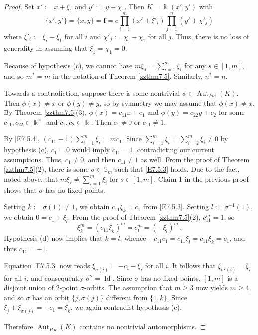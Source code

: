 \documentclass[12pt]{amsart}
\theoremstyle{plain}
\numberwithin{theorem}{section}
\numberwithin{equation}{theorem}
\theoremstyle{definition}
\newcommand{\SB}{\mathbb{S}}
\DeclareMathOperator{\Aut}{Aut}
\newcommand \bff {{\mathbf{f}}}
\newcommand \kx {\Bbbk^\times}
\DeclareMathOperator{\Id}{Id}
\begin{document}
\begin{proof}
Set $x' := x+\xi_1$ and $y' := y+\chi_1$.  Then $K = \Bbbk(x',y')$ with
$$
\{x',y'\} = \{x,y\} = \bff = c\prod_{i=1}^m (x'+\xi'_i) \prod_{j=1}^{n} (y'+\chi'_j)
$$
where $\xi'_i := \xi_i-\xi_1$ for all $i$ and $\chi'_j := \chi_j-\chi_1$ for all $j$.  Thus, there is no loss of generality in assuming that $\xi_1 = \chi_1 = 0$.

Because of hypothesis (c), we cannot have $m \xi_s = \sum_{i=1}^m \xi_i$ for any $s \in [1,m]$, and so $m^* = m$ in the notation of Theorem \ref{zzthm7.5}.  Similarly, $n^*=n$.

Towards a contradiction, suppose there is some nontrivial $\phi \in \Aut_{Poi}(K)$.  Then $\phi(x) \ne x$ or $\phi(y) \ne y$, so by symmetry we may assume that $\phi(x) \ne x$.  By Theorem \ref{zzthm7.5}(3), $\phi(x) = c_{11}x+c_1$ and $\phi(y) = c_{22}y+c_2$ for some $c_{11},c_{22} \in \kx$ and $c_1,c_2 \in \Bbbk$.  Then $c_1 \ne 0$ or $c_{11} \ne 1$.

By \eqref{E7.5.4}, $(c_{11}-1) \sum_{i=1}^m \xi_i = mc_1$.  Since $\sum_{i=1}^m \xi_i = \sum_{i=2}^m \xi_i \ne 0$ by hypothesis (c), $c_1=0$ would imply $c_{11}=1$, contradicting our current assumptions.  Thus, $c_1 \ne 0$, and then $c_{11} \ne 1$ as well.  From the proof of Theorem \ref{zzthm7.5}(2), there is some $\sigma \in \SB_m$ such that \eqref{E7.5.3} holds.  Due to the fact, noted above, that $m \xi_s \ne \sum_{i=1}^m \xi_i$ for $s \in [1,m]$, Claim 1 in the previous proof shows that $\sigma$ has no fixed points.

Setting $k := \sigma(1) \ne 1$, we obtain $c_{11} \xi_k = c_1$ from \eqref{E7.5.3}.  Setting $l := \sigma^{-1}(1)$, we obtain $0 = c_1 + \xi_l$.  From the proof of Theorem \ref{zzthm7.5}(2), $c_{11}^m=1$, so
$$
\xi_k^m = (c_{11} \xi_k)^m = c_1^m = (- \xi_l)^m \,.
$$
Hypothesis (d) now implies that $k=l$, whence $-c_{11} c_1 = c_{11} \xi_l = c_{11} \xi_k = c_1$, and thus $c_{11} = -1$.

Equation \eqref{E7.5.3} now reads $\xi_{\sigma(i)} = - c_1 - \xi_i$ for all $i$.  It follows that $\xi_{\sigma^2(i)} = \xi_i$ for all $i$, and consequently $\sigma^2 = \Id$.  Since $\sigma$ has no fixed points, $[1,m]$ is a disjoint union of $2$-point $\sigma$-orbits.  The assumption that $m\ge3$ now yields $m\ge4$, and so $\sigma$ has an orbit $\{j,\sigma(j)\}$ different from $\{1,k\}$.  Since $\xi_j + \xi_{\sigma(j)} = - c_1 = \xi_k$, we again contradict hypothesis (c).

Therefore $\Aut_{Poi}(K)$ contains no nontrivial automorphisms.
\end{proof}
\end{document}

